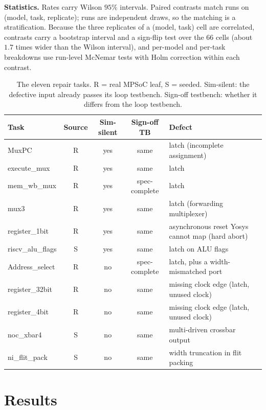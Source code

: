 \documentclass[11pt]{article}
\begin{document}
\textbf{Statistics.} Rates carry Wilson $95\%$ intervals. Paired contrasts
match runs on (model, task, replicate); runs are independent draws, so the
matching is a stratification. Because the three replicates of a (model, task)
cell are correlated, contrasts carry a bootstrap interval and a sign-flip test
over the $66$ cells (about $1.7$ times wider than the Wilson interval), and
per-model and per-task breakdowns use run-level McNemar tests with Holm
correction within each contrast.

\begin{table}[htbp]
\centering
\caption{The eleven repair tasks. R = real MPSoC leaf, S = seeded.
Sim-silent: the defective input already passes its loop testbench.
Sign-off testbench: whether it differs from the loop testbench.}
\label{tab:tasks}
\small
\begin{tabularx}{\linewidth}{@{} l c c c X @{}}
\toprule
\textbf{Task} & \textbf{Source} & \textbf{Sim-silent} & \textbf{Sign-off TB} & \textbf{Defect} \\
\midrule
MuxPC            & R & yes & same & latch (incomplete assignment) \\
execute\_mux     & R & yes & same & latch \\
mem\_wb\_mux     & R & yes & spec-complete & latch \\
mux3             & R & yes & same & latch (forwarding multiplexer) \\
register\_1bit   & R & yes & same & asynchronous reset Yosys cannot map (hard abort) \\
riscv\_alu\_flags & S & yes & same & latch on ALU flags \\
Address\_select  & R & no  & spec-complete & latch, plus a width-mismatched port \\
register\_32bit  & R & no  & same & missing clock edge (latch, unused clock) \\
register\_4bit   & R & no  & same & missing clock edge (latch, unused clock) \\
noc\_xbar4       & S & no  & same & multi-driven crossbar output \\
ni\_flit\_pack   & S & no  & same & width truncation in flit packing \\
\bottomrule
\end{tabularx}
\end{table}

\section{Results}
\label{sec:results}
\end{document}
